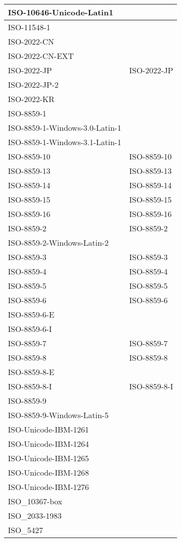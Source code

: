 \documentclass{wg21}
\begin{document}
\begin{longtable}{| p{} | p{} |}
ISO-10646-Unicode-Latin1 & \\ \hline
ISO-11548-1 & \\ \hline
ISO-2022-CN & \\ \hline
ISO-2022-CN-EXT & \\ \hline
ISO-2022-JP & ISO-2022-JP\\ \hline
ISO-2022-JP-2 & \\ \hline
ISO-2022-KR & \\ \hline
ISO-8859-1 & \\ \hline
ISO-8859-1-Windows-3.0-Latin-1 & \\ \hline
ISO-8859-1-Windows-3.1-Latin-1 & \\ \hline
ISO-8859-10 & ISO-8859-10\\ \hline
ISO-8859-13 & ISO-8859-13\\ \hline
ISO-8859-14 & ISO-8859-14\\ \hline
ISO-8859-15 & ISO-8859-15\\ \hline
ISO-8859-16 & ISO-8859-16\\ \hline
ISO-8859-2 & ISO-8859-2\\ \hline
ISO-8859-2-Windows-Latin-2 & \\ \hline
ISO-8859-3 & ISO-8859-3\\ \hline
ISO-8859-4 & ISO-8859-4\\ \hline
ISO-8859-5 & ISO-8859-5\\ \hline
ISO-8859-6 & ISO-8859-6\\ \hline
ISO-8859-6-E & \\ \hline
ISO-8859-6-I & \\ \hline
ISO-8859-7 & ISO-8859-7\\ \hline
ISO-8859-8 & ISO-8859-8\\ \hline
ISO-8859-8-E & \\ \hline
ISO-8859-8-I & ISO-8859-8-I\\ \hline
ISO-8859-9 & \\ \hline
ISO-8859-9-Windows-Latin-5 & \\ \hline
ISO-Unicode-IBM-1261 & \\ \hline
ISO-Unicode-IBM-1264 & \\ \hline
ISO-Unicode-IBM-1265 & \\ \hline
ISO-Unicode-IBM-1268 & \\ \hline
ISO-Unicode-IBM-1276 & \\ \hline
ISO_10367-box & \\ \hline
ISO_2033-1983 & \\ \hline
ISO_5427 & \\ \hline

\end{longtable}
\end{document}
